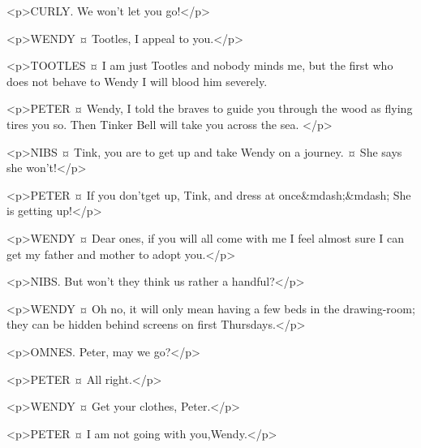 
<p>CURLY. We won't let you go!</p>

<p>WENDY ¤
Tootles, I appeal to you.</p>

<p>TOOTLES ¤
I am just Tootles and nobody minds me, but the first who does not behave to Wendy I will blood him severely.

<p>PETER ¤
Wendy, I told the braves to guide you through the wood as flying tires you so. Then Tinker Bell will take you across the sea.
</p>

<p>NIBS ¤
Tink, you are to get up and take Wendy on a journey.
¤
She says she won't!</p>

<p>PETER ¤
If you don'tget up, Tink, and dress at once&mdash;&mdash; She is getting up!</p>

<p>WENDY ¤
Dear ones, if you will all come with me I feel almost sure I can get my father and mother to adopt you.</p>


<p>NIBS. But won't they think us rather a handful?</p>

<p>WENDY ¤
Oh no, it will only mean having a few beds in the drawing-room; they can be hidden behind screens on first Thursdays.</p>


<p>OMNES. Peter, may we go?</p>

<p>PETER ¤
All right.</p>


<p>WENDY ¤
Get your clothes, Peter.</p>

<p>PETER ¤
I am not going with you,Wendy.</p>


